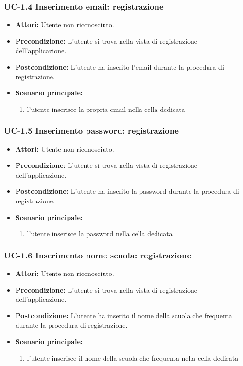 \subsubsection{UC-1.4 Inserimento email: registrazione}
\begin{itemize}
	\item \textbf{Attori: }Utente non riconosciuto.
	\item \textbf{Precondizione: }L'utente si trova nella vista 		di registrazione dell'applicazione.
	\item \textbf{Postcondizione: }L'utente ha inserito l'email durante la procedura di registrazione.
	\item \textbf{Scenario principale: }
	\begin{enumerate}
		\item l'utente inserisce la propria email nella cella dedicata
	\end{enumerate}
\end{itemize}

\subsubsection{UC-1.5 Inserimento password: registrazione}
\begin{itemize}
	\item \textbf{Attori: }Utente non riconosciuto.
	\item \textbf{Precondizione: }L'utente si trova nella vista 		di registrazione dell'applicazione.
	\item \textbf{Postcondizione: }L'utente ha inserito la password durante la procedura di registrazione.
	\item \textbf{Scenario principale: }
	\begin{enumerate}
		\item l'utente inserisce la password nella cella dedicata
	\end{enumerate}
\end{itemize}

\subsubsection{UC-1.6 Inserimento nome scuola: registrazione}
\begin{itemize}
	\item \textbf{Attori: }Utente non riconosciuto.
	\item \textbf{Precondizione: }L'utente si trova nella vista 		di registrazione dell'applicazione.
	\item \textbf{Postcondizione: }L'utente ha inserito il nome della scuola che frequenta durante la procedura di registrazione.
	\item \textbf{Scenario principale: }
	\begin{enumerate}
		\item l'utente inserisce il nome della scuola che frequenta nella cella dedicata
	\end{enumerate}
\end{itemize}


